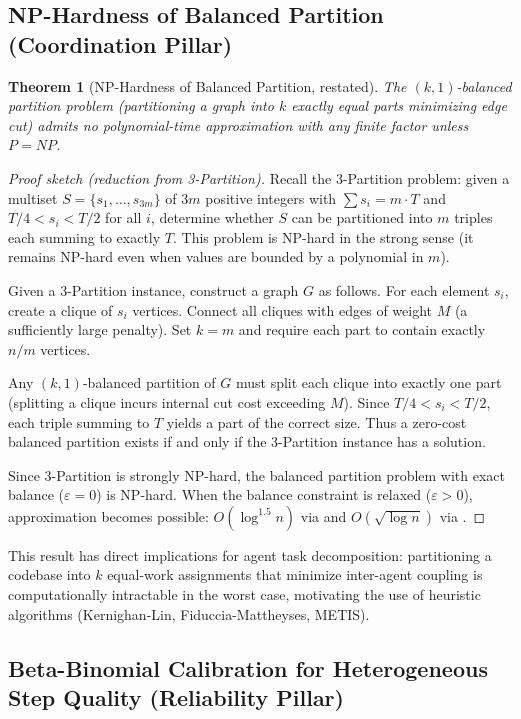 \documentclass[11pt, a4paper]{googledeepmind}
\newtheorem{theorem}{Theorem}[section]
\begin{document}
\begin{appendices}
\subsection{NP-Hardness of Balanced Partition (Coordination Pillar)}

\begin{theorem}[NP-Hardness of Balanced Partition, restated]
The $(k, 1)$-balanced partition problem (partitioning a graph into $k$ exactly
equal parts minimizing edge cut) admits no polynomial-time approximation with
any finite factor unless $P = NP$.
\end{theorem}

\begin{proof}[Proof sketch (reduction from 3-Partition)]
Recall the 3-Partition problem: given a multiset $S = \{s_1, \ldots, s_{3m}\}$
of $3m$ positive integers with $\sum s_i = m \cdot T$ and $T/4 < s_i < T/2$
for all $i$, determine whether $S$ can be partitioned into $m$ triples each
summing to exactly $T$. This problem is NP-hard in the strong sense
(it remains NP-hard even when values are bounded by a polynomial in $m$).

Given a 3-Partition instance, construct a graph $G$ as follows.
For each element $s_i$, create a clique of $s_i$ vertices.
Connect all cliques with edges of weight $M$ (a sufficiently large penalty).
Set $k = m$ and require each part to contain exactly $n/m$ vertices.

Any $(k, 1)$-balanced partition of $G$ must split each clique into exactly
one part (splitting a clique incurs internal cut cost exceeding $M$).
Since $T/4 < s_i < T/2$, each triple summing to $T$ yields a part of the
correct size. Thus a zero-cost balanced partition exists if and only if
the 3-Partition instance has a solution.

Since 3-Partition is strongly NP-hard, the balanced partition problem
with exact balance ($\varepsilon = 0$) is NP-hard. When the balance constraint
is relaxed ($\varepsilon > 0$), approximation becomes possible:
$O(\log^{1.5} n)$ via \citet{AndreevRacke2006} and
$O(\sqrt{\log n})$ via \citet{AroraRaoVazirani2009}.
\end{proof}

This result has direct implications for agent task decomposition:
partitioning a codebase into $k$ equal-work assignments that minimize
inter-agent coupling is computationally intractable in the worst case,
motivating the use of heuristic algorithms (Kernighan-Lin, Fiduccia-Mattheyses, METIS).


\subsection{Beta-Binomial Calibration for Heterogeneous Step Quality (Reliability Pillar)}


\end{appendices}
\end{document}
